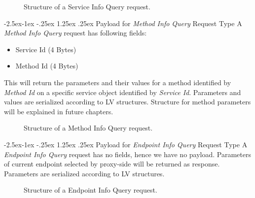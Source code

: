 \documentclass[10pt,a4paper]{article}
\makeatletter
\renewcommand\paragraph{\@startsection{paragraph}{4}{\z@}%
            {-2.5ex\@plus -1ex \@minus -.25ex}%
            {1.25ex \@plus .25ex}%
            {\normalfont\normalsize\bfseries}}
\makeatother
\begin{document}
\begin{figure}[!ht]
  \caption{Structure of a Service Info Query request.}
  \centering
\end{figure}

\paragraph{Payload for \textit{Method Info Query} Request Type} 
A \textit{Method Info Query} request has following fields:
\begin{itemize}
  \item Service Id (4 Bytes)
  \item Method Id (4 Bytes)
\end{itemize}
This will return the parameters and their values for a method identified by \textit{Method Id} on a specific service object identified by \textit{Service Id}. Parameters and values are serialized according to LV structures. Structure for method parameters will be explained in future chapters.

\begin{figure}[!ht]
  \caption{Structure of a Method Info Query request.}
  \centering
\end{figure}

\paragraph{Payload for \textit{Endpoint Info Query} Request Type} 
A \textit{Endpoint Info Query} request has no fields, hence we have no payload. Parameters of current endpoint selected by proxy-side will be returned as response. Parameters are serialized according to LV structures.

\begin{figure}[!ht]
  \caption{Structure of a Endpoint Info Query request.}
  \centering
\end{figure}
\end{document}

